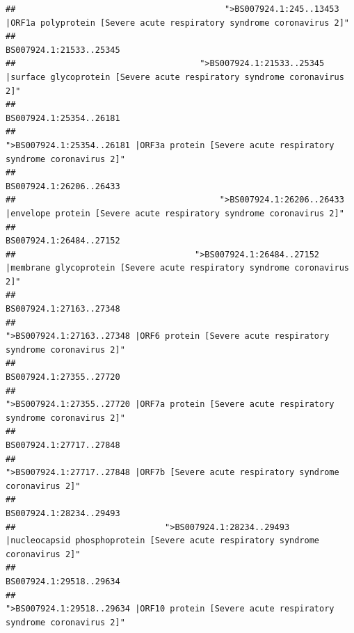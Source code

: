 \documentclass[
]{article}
\begin{document}
\begin{verbatim}
##                                          ">BS007924.1:245..13453 |ORF1a polyprotein [Severe acute respiratory syndrome coronavirus 2]" 
##                                                                                                                BS007924.1:21533..25345 
##                                     ">BS007924.1:21533..25345 |surface glycoprotein [Severe acute respiratory syndrome coronavirus 2]" 
##                                                                                                                BS007924.1:25354..26181 
##                                            ">BS007924.1:25354..26181 |ORF3a protein [Severe acute respiratory syndrome coronavirus 2]" 
##                                                                                                                BS007924.1:26206..26433 
##                                         ">BS007924.1:26206..26433 |envelope protein [Severe acute respiratory syndrome coronavirus 2]" 
##                                                                                                                BS007924.1:26484..27152 
##                                    ">BS007924.1:26484..27152 |membrane glycoprotein [Severe acute respiratory syndrome coronavirus 2]" 
##                                                                                                                BS007924.1:27163..27348 
##                                             ">BS007924.1:27163..27348 |ORF6 protein [Severe acute respiratory syndrome coronavirus 2]" 
##                                                                                                                BS007924.1:27355..27720 
##                                            ">BS007924.1:27355..27720 |ORF7a protein [Severe acute respiratory syndrome coronavirus 2]" 
##                                                                                                                BS007924.1:27717..27848 
##                                                    ">BS007924.1:27717..27848 |ORF7b [Severe acute respiratory syndrome coronavirus 2]" 
##                                                                                                                BS007924.1:28234..29493 
##                              ">BS007924.1:28234..29493 |nucleocapsid phosphoprotein [Severe acute respiratory syndrome coronavirus 2]" 
##                                                                                                                BS007924.1:29518..29634 
##                                            ">BS007924.1:29518..29634 |ORF10 protein [Severe acute respiratory syndrome coronavirus 2]" 

\end{verbatim}
\end{document}
